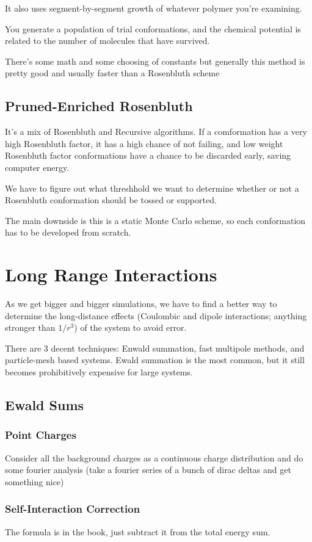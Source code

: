 \documentclass[fleqn]{report}
\begin{document}
It also uses segment-by-segment growth of whatever polymer you're examining. 

You generate a population of trial conformations, and the chemical 
potential is related to the number of molecules that have survived. 

There's some math and some choosing of constants but generally this method 
is pretty good and usually faster than a Rosenbluth scheme 

\section{Pruned-Enriched Rosenbluth}
It's a mix of Rosenbluth and Recursive algorithms. If a comformation has a 
very high Rosenbluth factor, it has a high chance of not failing, 
and low weight Rosenbluth factor conformations have a chance to be discarded 
early, saving computer energy. 

We have to figure out what threshhold we want to determine whether 
or not a Rosenbluth conformation should be tossed or supported. 

The main downside is this is a static Monte Carlo scheme, so each conformation 
has to be developed from scratch. 

\chapter{Long Range Interactions}
As we get bigger and bigger simulations, we have to find a better way to determine 
the long-distance effects (Coulombic and dipole interactions; anything 
stronger than $1/r^3$) of the system to avoid error. 

There are 3 decent techniques: Enwald summation, fast multipole methods, and 
particle-mesh based systems. Ewald summation is the most common, but it 
still becomes prohibitively expensive for large systems. 

\section{Ewald Sums}
\subsection{Point Charges}
Consider all the background charges as a continuous charge distribution 
and do some fourier analysis (take a fourier series of a bunch of 
dirac deltas and get something nice)

\subsection{Self-Interaction Correction}
The formula is in the book, just subtract it from the total energy sum. 
\end{document}
